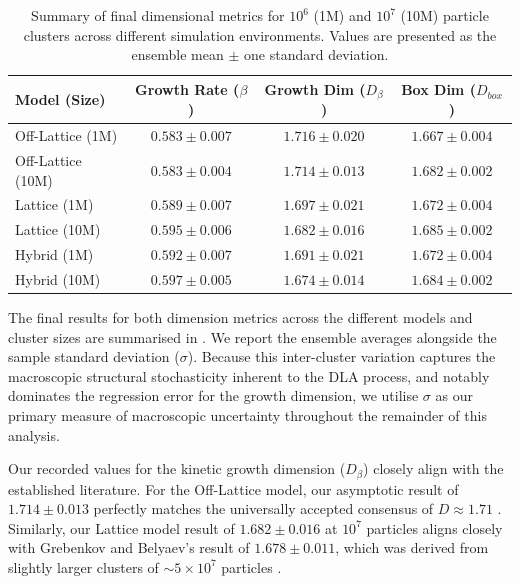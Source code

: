 \documentclass[12pt, a4paper, oneside]{report}
\theoremstyle{remark}
\begin{document}
\begin{table}[htbp]
    \centering
    \caption{Summary of final dimensional metrics for $10^6$ (1M) and $10^7$ (10M) particle clusters across different simulation environments. Values are presented as the ensemble mean $\pm$ one standard deviation.}
    \label{tab:dim_results}
    \begin{tabular}{lccc}
        \toprule
        \textbf{Model (Size)} & \textbf{Growth Rate ($\beta$)} & \textbf{Growth Dim ($D_\beta$)} & \textbf{Box Dim ($D_{box}$)} \\
        \midrule
        Off-Lattice (1M) & $0.583 \pm 0.007$ & $1.716 \pm 0.020$ & $1.667 \pm 0.004$ \\
        Off-Lattice (10M)& $0.583 \pm 0.004$ & $1.714 \pm 0.013$ & $1.682 \pm 0.002$ \\
        \midrule
        Lattice (1M)     & $0.589 \pm 0.007$ & $1.697 \pm 0.021$ & $1.672 \pm 0.004$ \\
        Lattice (10M)    & $0.595 \pm 0.006$ & $1.682 \pm 0.016$ & $1.685 \pm 0.002$ \\
        \midrule
        Hybrid (1M)      & $0.592 \pm 0.007$ & $1.691 \pm 0.021$ & $1.672 \pm 0.004$ \\
        Hybrid (10M)     & $0.597 \pm 0.005$ & $1.674 \pm 0.014$ & $1.684 \pm 0.002$ \\
        \bottomrule
    \end{tabular}
\end{table}

The final results for both dimension metrics across the different models and cluster sizes are summarised in . We report the ensemble averages alongside the sample standard deviation ($\sigma$). Because this inter-cluster variation captures the macroscopic structural stochasticity inherent to the DLA process, and notably dominates the regression error for the growth dimension, we utilise $\sigma$ as our primary measure of macroscopic uncertainty throughout the remainder of this analysis.

Our recorded values for the kinetic growth dimension ($D_\beta$) closely align with the established literature. For the Off-Lattice model, our asymptotic result of $1.714 \pm 0.013$ perfectly matches the universally accepted consensus of $D \approx 1.71$ \cite{ossadnik1991}. Similarly, our Lattice model result of $1.682 \pm 0.016$ at $10^7$ particles aligns closely with Grebenkov and Belyaev's result of $1.678 \pm 0.011$, which was derived from slightly larger clusters of $\sim 5 \times 10^7$ particles \cite{Grebenkov2017}. 
\end{document}

